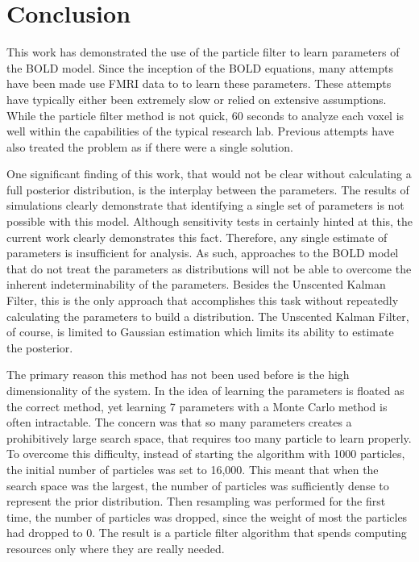 \chapter{Conclusion}
\label{sec:Conclusion}
This work has demonstrated the use of the particle filter to
learn parameters of the BOLD model. Since the inception of the
BOLD equations, many attempts have been made use FMRI data to 
to learn these parameters. These attempts have typically either been extremely 
slow or relied on extensive assumptions. While the particle filter method
is not quick, 60 seconds to analyze each voxel is well within the capabilities
of the typical research lab. Previous attempts have also treated
the problem as if there were a single solution.

One significant finding of this work, that would not be clear without 
calculating a full posterior distribution, is the interplay 
between the parameters. The results of simulations clearly demonstrate
that identifying a single set of parameters is not possible with this 
model. Although sensitivity tests in \cite{Deneux2006} certainly hinted
at this, the current work clearly demonstrates this fact. Therefore,
any single estimate of parameters is insufficient for analysis. As such,
approaches to the BOLD model that do not treat the parameters as distributions
will not be able to overcome the inherent indeterminability of the
parameters. Besides the Unscented Kalman Filter, this is the only approach
that accomplishes this task without repeatedly calculating the parameters 
to build a distribution. The Unscented Kalman Filter, of course, is limited
to Gaussian estimation which limits its ability to estimate the posterior. 

The primary reason this method has not been used before is the high 
dimensionality of the system. In \cite{Murray2008} the idea of learning
the parameters is floated as the correct method, yet 
learning 7 parameters with a Monte Carlo method is often intractable. The 
concern was that so many parameters creates a prohibitively large 
search space, that requires too many particle to learn properly. To overcome
this difficulty, instead of starting the algorithm with 1000 particles,
the initial number of particles was set to 16,000. This meant that
when the search space was the largest, the number of particles was
sufficiently dense to represent the prior distribution. Then resampling
was performed for the first time, the number of particles was dropped, 
since the weight of most the particles had dropped to 0. The result is
a particle filter algorithm that spends computing resources only where
they are really needed.

